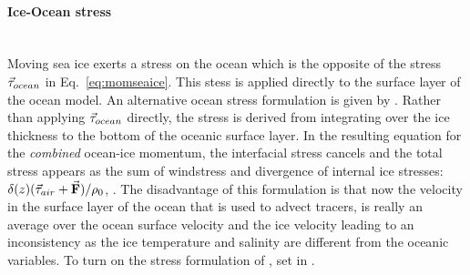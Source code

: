 \paragraph{Ice-Ocean stress \label{sec:pkg:seaice:iceoceanstress}}~\\
%
Moving sea ice exerts a stress on the ocean which is the opposite of
the stress $\vec{\mathbf{\mathbf{\tau}}}_{ocean}$ in Eq.~\ref{eq:momseaice}. This stess is
applied directly to the surface layer of the ocean model. An
alternative ocean stress formulation is given by \citet{hibler87}.
Rather than applying $\vec{\mathbf{\mathbf{\tau}}}_{ocean}$ directly, the stress is derived
from integrating over the ice thickness to the bottom of the oceanic
surface layer. In the resulting equation for the \emph{combined}
ocean-ice momentum, the interfacial stress cancels and the total
stress appears as the sum of windstress and divergence of internal ice
stresses: $\delta(z) (\vec{\mathbf{\mathbf{\tau}}}_{air} + \vec{\mathbf{F}})/\rho_0$, \citep[see also
Eq.\,2 of][]{hibler87}. The disadvantage of this formulation is that
now the velocity in the surface layer of the ocean that is used to
advect tracers, is really an average over the ocean surface
velocity and the ice velocity leading to an inconsistency as the ice
temperature and salinity are different from the oceanic variables.
To turn on the stress formulation of \citet{hibler87}, set
 in .



